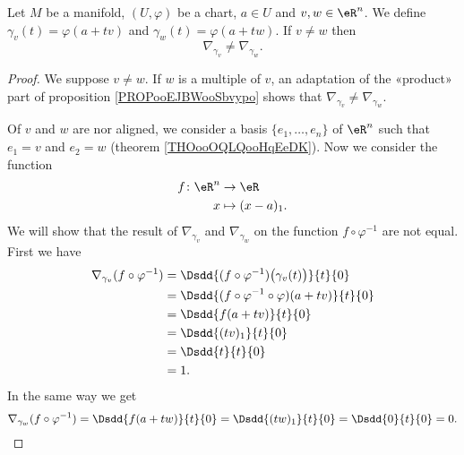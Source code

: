\begin{lemma}       \label{LEMooGPCBooXMTddG}
    Let \( M\) be a manifold, \( (U,\varphi)\) be a chart, \( a\in U\) and \( v,w\in \eR^n\). We define \( \gamma_v(t)=\varphi(a+tv)\) and \( \gamma_w(t)=\varphi(a+tw)\). If \( v\neq w\) then 
    \begin{equation}
        \nabla_{\gamma_v}\neq \nabla_{\gamma_w}.
    \end{equation}
\end{lemma}

\begin{proof}
    We suppose \( v\neq w\). If \( w\) is a multiple of \( v\), an adaptation of the «product» part of proposition \ref{PROPooEJBWooSbvypo} shows that \( \nabla_{\gamma_v}\neq \nabla_{\gamma_w}\).

    Of \( v\) and \( w\) are nor aligned, we consider a basis \( \{ e_1,\ldots, e_n \}\) of \( \eR^n\) such that \( e_1=v\) and \( e_2=w\) (theorem \ref{THOooOQLQooHqEeDK}). Now we consider the function
    \begin{equation}
        \begin{aligned}
            f\colon \eR^n&\to \eR \\
            x&\mapsto (x-a)_1. 
        \end{aligned}
    \end{equation}
    We will show that the result of \( \nabla_{\gamma_v}\) and \( \nabla_{\gamma_w}\) on the function \( f\circ\varphi^{-1}\) are not equal. First we have
    \begin{subequations}
        \begin{align}
            \nabla_{\gamma_v}(f\circ\varphi^{-1})&=\Dsdd{ (f\circ\varphi^{-1})\big( \gamma_v(t) \big) }{t}{0}\\
            &=\Dsdd{ (f\circ\varphi^{-1}\circ\varphi)(a+tv) }{t}{0}\\
            &=\Dsdd{ f(a+tv) }{t}{0}\\
            &=\Dsdd{ (tv)_1 }{t}{0}\\
            &=\Dsdd{ t }{t}{0}\\
            &=1.
        \end{align}
    \end{subequations}
    In the same way we get
    \begin{equation}
        \nabla_{\gamma_w}(f\circ\varphi^{-1})=\Dsdd{ f(a+tw) }{t}{0}=\Dsdd{ (tw)_1 }{t}{0}=\Dsdd{ 0 }{t}{0}=0.
    \end{equation}
\end{proof}


